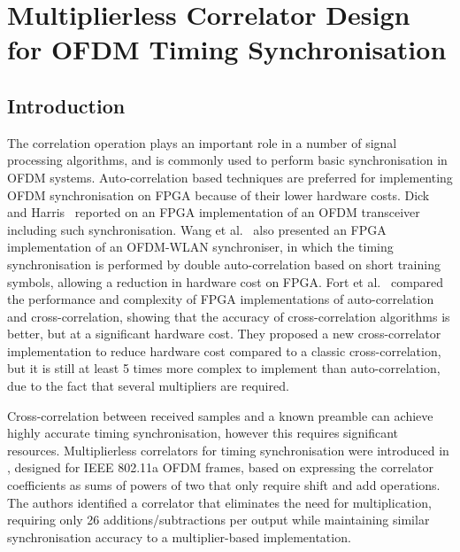 \chapter{Multiplierless Correlator Design for OFDM Timing Synchronisation}
\label{chap:multiplierlesscorrelator}

\section{Introduction}
The correlation operation plays an important role in a number of signal processing algorithms, and is commonly used to perform basic synchronisation in OFDM systems.
Auto-correlation based techniques are preferred for implementing OFDM synchronisation on FPGA because of their lower hardware costs.
Dick and Harris~\cite{Dick2003} reported on an FPGA implementation of an OFDM transceiver including such synchronisation.
Wang et al.~\cite{Wang2004} also presented an FPGA implementation of an OFDM-WLAN synchroniser, in which the timing synchronisation is performed by double auto-correlation based on short training symbols, allowing a reduction in hardware cost on FPGA.
Fort et al.~\cite{Fort2003} compared the performance and complexity of FPGA implementations of auto-correlation and cross-correlation, showing that the accuracy of cross-correlation algorithms is better, but at a significant hardware cost.
They proposed a new cross-correlator implementation to reduce hardware cost compared to a classic cross-correlation, but it is still at least 5 times more complex to implement than auto-correlation, due to the fact that several multipliers are required.

Cross-correlation between received samples and a known preamble can achieve highly accurate timing synchronisation, however this requires significant resources.
Multiplierless correlators for timing synchronisation were introduced in \cite{Yip2003}, designed for IEEE 802.11a OFDM frames, based on expressing the correlator coefficients as sums of powers of two that only require shift and add operations.
The authors identified a correlator that eliminates the need for multiplication, requiring only 26 additions/subtractions per output while maintaining similar synchronisation accuracy to a multiplier-based implementation.

